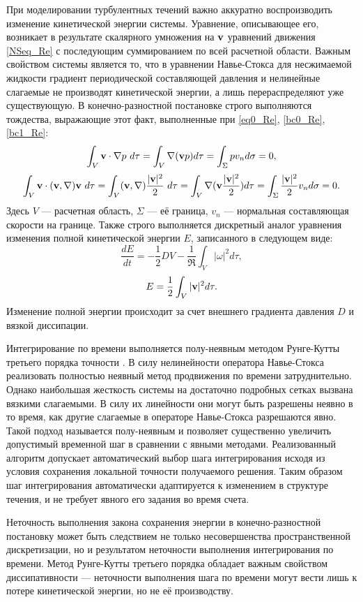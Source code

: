 При моделировании турбулентных течений важно аккуратно воспроизводить изменение кинетической энергии системы. Уравнение, описывающее его, возникает в результате скалярного умножения на $\mathbf{v}$ уравнений движения \eqref{NSeq_Re} с последующим суммированием по всей расчетной области. Важным свойством системы является то, что в уравнении Навье-Стокса для несжимаемой жидкости градиент периодической составляющей давления и нелинейные слагаемые не производят кинетической энергии, а лишь перераспределяют уже существующую. В конечно-разностной постановке строго выполняются тождества, выражающие этот факт, выполненные при \eqref{eq0_Re}, \eqref{bc0_Re}, \eqref{bc1_Re}:
$$
\int_V \mathbf{v} \cdot \nabla p\ d\tau= \int_V \nabla (\mathbf{v} p) d\tau = \int_{\Sigma} p v_n d\sigma = 0, 
$$
$$
\int_V \mathbf{v} \cdot (\mathbf{v}, \nabla) \mathbf{v}\ d\tau = \int_V (\mathbf{v}, \nabla)\frac{|\mathbf{v}|^2}{2}\ d\tau = \int_V \nabla (\mathbf{v} \frac{|\mathbf{v}|^2}{2}) d\tau = \int_{\Sigma} \frac{|\mathbf{v}|^2}{2} v_n d\sigma = 0.
$$
Здесь $V$ --- расчетная область, $\Sigma$ --- её граница, $v_n$ --- нормальная составляющая скорости на границе. Также строго выполняется дискретный аналог уравнения изменения полной кинетической энергии $E$, записанного в следующем виде:
\begin{equation} \label{Eeq}
\frac{d E}{d t} = - \frac{1}{2}DV - \frac{1}{\Re} \int_{V} |\omega|^2 d\tau,
\end{equation}
$$
E = \frac{1}{2}\int_{V} |\mathbf{v}|^2 d\tau.
$$
Изменение полной энергии происходит за счет внешнего градиента давления $D$ и вязкой диссипации. 

Интегрирование по времени выполняется полу-неявным методом Рунге-Кутты третьего порядка точности \cite{Nikitin2006third}. В силу нелинейности оператора Навье-Стокса реализовать полностью неявный метод продвижения по времени затруднительно. Однако наибольшая жесткость системы на достаточно подробных сетках вызвана вязкими слагаемыми. В силу их линейности они могут быть разрешены неявно в то время, как другие слагаемые в операторе Навье-Стокса разрешаются явно. Такой подход называется полу-неявным и позволяет существенно увеличить допустимый временной шаг в сравнении с явными методами. Реализованный алгоритм допускает автоматический выбор шага интегрирования исходя из условия сохранения локальной точности получаемого решения. Таким образом шаг интегрирования автоматически адаптируется к изменением в структуре течения, и не требует явного его задания во время счета. 

Неточность выполнения закона сохранения энергии в конечно-разностной постановку может быть следствием не только несовершенства пространственной дискретизации, но и результатом неточности выполнения интегрирования по времени. Метод Рунге-Кутты третьего порядка обладает важным свойством диссипативности --- неточности выполнения шага по времени могут вести лишь к потере кинетической энергии, но не её производству. 


